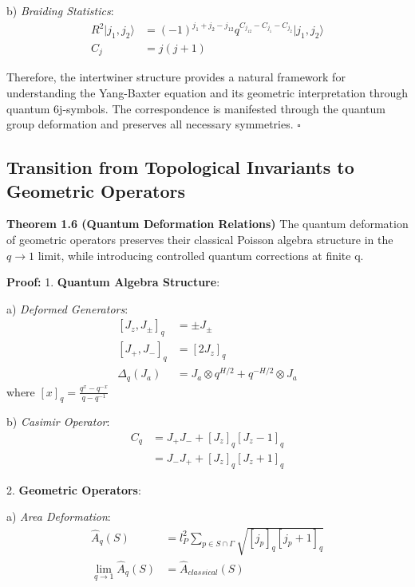 \documentclass[12pt,a4paper]{article}
\begin{document}
   b) \textit{Braiding Statistics}:
      \[
      \begin{aligned}
      R^2|j_1,j_2\rangle &= (-1)^{j_1+j_2-j_{12}}q^{C_{j_{12}}-C_{j_1}-C_{j_2}}|j_1,j_2\rangle \\
      C_j &= j(j+1)
      \end{aligned}
      \]

Therefore, the intertwiner structure provides a natural framework for understanding the Yang-Baxter equation and its geometric interpretation through quantum 6j-symbols. The correspondence is manifested through the quantum group deformation and preserves all necessary symmetries. $\square$

\subsection{Transition from Topological Invariants to Geometric Operators}

\textbf{Theorem 1.6 (Quantum Deformation Relations)}
The quantum deformation of geometric operators preserves their classical Poisson algebra structure in the $q \to 1$ limit, while introducing controlled quantum corrections at finite q.

\textbf{Proof:}
1. \textbf{Quantum Algebra Structure}:
   
   a) \textit{Deformed Generators}:
      \[
      \begin{aligned}
      [J_z, J_{\pm}]_q &= \pm J_{\pm} \\
      [J_+, J_-]_q &= [2J_z]_q \\
      \Delta_q(J_a) &= J_a \otimes q^{H/2} + q^{-H/2} \otimes J_a
      \end{aligned}
      \]
      where $[x]_q = \frac{q^x - q^{-x}}{q - q^{-1}}$
   
   b) \textit{Casimir Operator}:
      \[
      \begin{aligned}
      C_q &= J_+J_- + [J_z]_q[J_z-1]_q \\
      &= J_-J_+ + [J_z]_q[J_z+1]_q
      \end{aligned}
      \]

2. \textbf{Geometric Operators}:
   
   a) \textit{Area Deformation}:
      \[
      \begin{aligned}
      \hat{A}_q(S) &= l_P^2 \sum_{p \in S \cap \Gamma} \sqrt{[j_p]_q[j_p+1]_q} \\
      \lim_{q \to 1}\hat{A}_q(S) &= \hat{A}_{classical}(S)
      \end{aligned}
      \]
   
\end{document}
